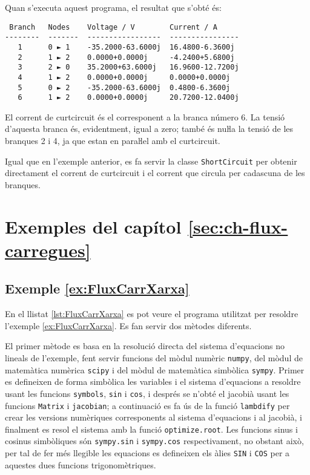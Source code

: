 Quan s'executa aquest programa, el resultat que s'obté és:
\lstset{
	language=,
	numbers=none,
	frame=none
}
\begin{lstlisting}
 Branch   Nodes    Voltage / V        Current / A
--------  -------  -----------------  ----------------
   1      0 ► 1    -35.2000-63.6000j  16.4800-6.3600j
   2      1 ► 2    0.0000+0.0000j     -4.2400+5.6800j
   3      2 ► 0    35.2000+63.6000j   16.9600-12.7200j
   4      1 ► 2    0.0000+0.0000j     0.0000+0.0000j
   5      0 ► 2    -35.2000-63.6000j  0.4800-6.3600j
   6      1 ► 2    0.0000+0.0000j     20.7200-12.0400j
\end{lstlisting}

El corrent de curtcircuit és el corresponent a la branca número 6. La tensió d'aquesta branca és, evidentment, igual a zero; també és nuŀla la tensió de les branques 2 i 4, ja que estan en paraŀlel amb el curtcircuit.

Igual que en l'exemple anterior, es fa servir la classe   \texttt{ShortCircuit} per obtenir directament el corrent de curtcircuit i el corrent que circula per cadascuna de les branques.


\section{Exemples del capítol \ref*{sec:ch-flux-carregues}}

\hypertarget{exemple:FluxCarrXarxa}{\subsection{Exemple \ref*{ex:FluxCarrXarxa} \FluxCarrXarxa}}
En el llistat \vref{lst:FluxCarrXarxa} es pot veure el programa utilitzat per resoldre l'exemple \vref{ex:FluxCarrXarxa}. Es fan servir dos mètodes diferents.

El primer mètode es basa en la resolució directa del sistema d'equacions no lineals de l'exemple, fent servir funcions del mòdul numèric \texttt{numpy}, del mòdul de matemàtica numèrica \texttt{scipy} i del mòdul de matemàtica simbòlica \texttt{sympy}. Primer es defineixen de forma simbòlica les variables i el sistema d'equacions a resoldre usant les funcions \texttt{symbols}, \texttt{sin} i \texttt{cos}, i després se n'obté el jacobià usant les funcions \texttt{Matrix} i \texttt{jacobian}; a continuació es fa ús de la funció  \texttt{lambdify} per crear les versions numèriques corresponents al sistema d'equacions i al jacobià, i finalment es resol el sistema amb la funció \texttt{optimize.root}. Les funcions sinus i cosinus simbòliques són  \texttt{sympy.sin} i  \texttt{sympy.cos} respectivament, no obstant això,  per tal de fer més llegible les equacions es defineixen els àlies \texttt{SIN} i \texttt{COS} per a aquestes dues funcions trigonomètriques.

